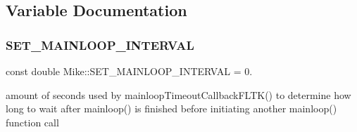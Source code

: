 \subsection{Variable Documentation}
\mbox{\label{namespace_mike_abbeda217f93388b7dd036c32d183f426}} 
\subsubsection{\texorpdfstring{S\+E\+T\+\_\+\+M\+A\+I\+N\+L\+O\+O\+P\+\_\+\+I\+N\+T\+E\+R\+V\+AL}{SET\_MAINLOOP\_INTERVAL}}
{\footnotesize\ttfamily const double Mike\+::\+S\+E\+T\+\_\+\+M\+A\+I\+N\+L\+O\+O\+P\+\_\+\+I\+N\+T\+E\+R\+V\+AL = 0.\hspace{0.3cm}{\ttfamily [static]}}

amount of seconds used by mainloop\+Timeout\+Callback\+F\+L\+T\+K() to determine how long to wait after mainloop() is finished before initiating another mainloop() function call 
